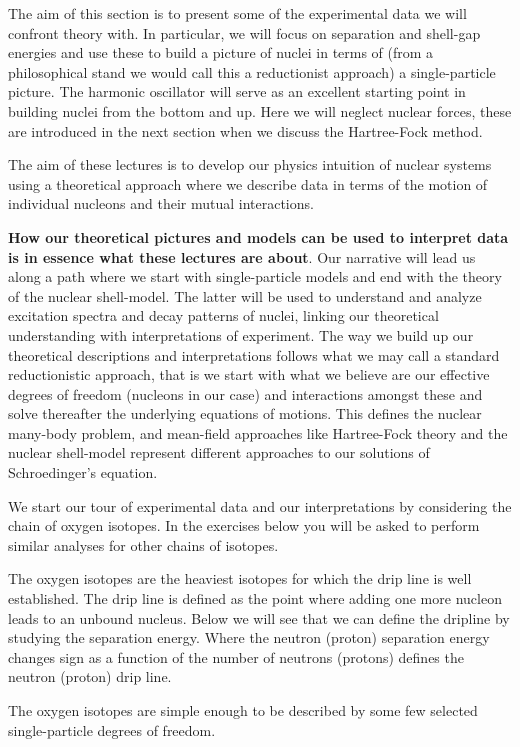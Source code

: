 \documentclass[%
twoside,                 %
final,                   %
10pt]{article}
\begin{document}
The aim of this section is to present some of the experimental data we will confront theory with. In particular, we will focus on separation and shell-gap energies and use these to build a picture of nuclei in terms of (from a philosophical stand we would call this  a reductionist approach) a single-particle picture. The harmonic oscillator will serve as an excellent starting point in building nuclei from the bottom and up. Here we will neglect nuclear forces, these are introduced in the next section when we discuss the Hartree-Fock method. 

The aim of these lectures is to develop our physics intuition of nuclear systems using  a theoretical approach  where we describe data in terms of 
the motion of individual nucleons and their mutual interactions. 

\textbf{How our theoretical pictures and models can be used to interpret data is in essence what these lectures are about}. Our narrative will lead us along a path where we start with single-particle models and end with the theory of the nuclear shell-model. The latter will be used to understand and analyze excitation spectra and decay patterns of nuclei, linking our theoretical understanding with interpretations of experiment. The way we build up our theoretical descriptions and interpretations follows what we may call a standard reductionistic approach, that is we start with what we believe are our effective degrees of freedom (nucleons in our case) and interactions amongst these and solve thereafter the underlying equations of motions. This defines the nuclear many-body problem, and mean-field approaches like Hartree-Fock theory and the nuclear shell-model represent different approaches to our solutions of Schroedinger's equation. 



We start our tour of experimental data and our interpretations by considering the chain of oxygen isotopes. In the exercises below you will be asked to perform similar analyses for other chains of isotopes.

The oxygen isotopes are the heaviest isotopes for which the drip line is well established.  The drip line is defined as the point where adding one more nucleon leads to an unbound nucleus. Below we will see that we can define the dripline by studying the separation energy. Where the neutron (proton) separation energy changes sign as a function of the number of neutrons (protons) defines the neutron (proton) drip line.

The oxygen isotopes are simple enough to be described by some few selected single-particle degrees of freedom.  
\end{document}

